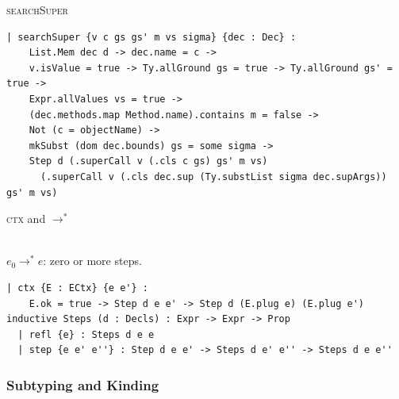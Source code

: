 \begin{cmp}{\textsc{searchSuper}}
\begin{paperside}
\end{paperside}
\begin{leanside}
\begin{lstlisting}[style=leanside]
| searchSuper {v c gs gs' m vs sigma} {dec : Dec} :
    List.Mem dec d -> dec.name = c ->
    v.isValue = true -> Ty.allGround gs = true -> Ty.allGround gs' = true ->
    Expr.allValues vs = true ->
    (dec.methods.map Method.name).contains m = false ->
    Not (c = objectName) ->
    mkSubst (dom dec.bounds) gs = some sigma ->
    Step d (.superCall v (.cls c gs) gs' m vs)
      (.superCall v (.cls dec.sup (Ty.substList sigma dec.supArgs)) gs' m vs)
\end{lstlisting}
\end{leanside}
\end{cmp}

\begin{cmp}{\textsc{ctx} and $\rightarrow^*$}
\begin{paperside}
\\[1ex]
$e_0\rightarrow^* e$: zero or more steps.
\end{paperside}
\begin{leanside}
\begin{lstlisting}[style=leanside]
| ctx {E : ECtx} {e e'} :
    E.ok = true -> Step d e e' -> Step d (E.plug e) (E.plug e')
inductive Steps (d : Decls) : Expr -> Expr -> Prop
  | refl {e} : Steps d e e
  | step {e e' e''} : Step d e e' -> Steps d e' e'' -> Steps d e e''
\end{lstlisting}
\end{leanside}
\end{cmp}

\subsubsection{Subtyping and Kinding}

